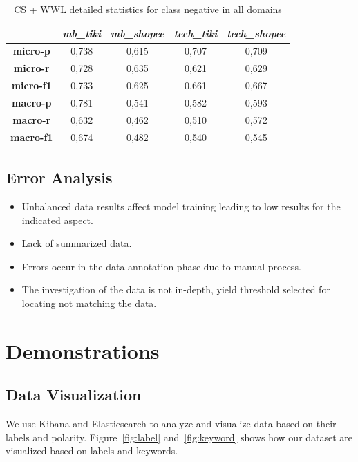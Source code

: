 \begin{table}[h]
\centering
\begin{tabular}{|c|c|c|c|c|}
\hline
 & \textit{\textbf{mb\_tiki}} & \textit{\textbf{mb\_shopee}} & \textit{\textbf{tech\_tiki}} & \textit{\textbf{tech\_shopee}} \\ \hline
\textbf{micro-p}  & 0,738 & 0,615 & 0,707 & 0,709 \\ \hline
\textbf{micro-r}  & 0,728 & 0,635 & 0,621 & 0,629 \\ \hline
\textbf{micro-f1} & 0,733 & 0,625 & 0,661 & 0,667 \\ \hline
\textbf{macro-p}  & 0,781 & 0,541 & 0,582 & 0,593 \\ \hline
\textbf{macro-r}  & 0,632 & 0,462 & 0,510 & 0,572 \\ \hline
\textbf{macro-f1} & 0,674 & 0,482 & 0,540 & 0,545 \\ \hline
\end{tabular}
\caption{CS + WWL detailed statistics for class negative in all domains}
\label{tab:detailneg}
\end{table}

\subsection{Error Analysis}
\begin{itemize}
    \item Unbalanced data results affect model training leading to low results for the indicated aspect.
    \item Lack of summarized data.
    \item Errors occur in the data annotation phase due to manual process.
    \item The investigation of the data is not in-depth, yield threshold selected for locating not matching the data.
\end{itemize}

\section{Demonstrations}
\subsection{Data Visualization}
We use Kibana and Elasticsearch to analyze and visualize data based on their labels and polarity. Figure~\ref{fig:label} and~\ref{fig:keyword} shows how our dataset are visualized based on labels and keywords.

